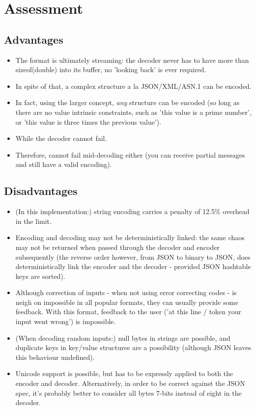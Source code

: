 \section{Assessment}

\subsection{Advantages}

\begin{itemize}
\item The format is ultimately streaming: the decoder never has to have
      more than sizeof(double) into its buffer, no 'looking back' is
      ever required.
\item In spite of that, a complex structure a la JSON/XML/ASN.1 can be
      encoded.
\item In fact, using the larger concept, \textit{any} structure can
      be encoded (so long as there are no value intrinsic constraints, such
      as 'this value is a prime number', or 'this value is three times the
      previous value').
\item While the decoder cannot fail.
\item Therefore, cannot fail mid-decoding either (you can receive
      partial messages and still have a valid encoding).
\end{itemize}

\subsection{Disadvantages}

\begin{itemize}
\item (In this implementation:)
      string encoding carries a penalty of 12.5\% overhead in the limit.
\item Encoding and decoding may not be deterministically linked: the same
      chaos may not be returned when passed through the decoder and encoder
      subsequently (the reverse order however, from JSON to binary to JSON,
      does deterministically link the encoder and the decoder - provided
      JSON hashtable keys are sorted).
\item Although correction of inputs - when not using error correcting codes -
      is neigh on impossible in all popular formats, they can usually
      provide some feedback. With this format, feedback to the user
      ('at this line / token your input went wrong') is impossible.
\item (When decoding random inputs:) null bytes in strings are possible,
      and duplicate
      keys in key/value structures are a possibility (although JSON
      leaves this behaviour undefined).
\item Unicode support is possible, but has to be expressly applied to
      both the encoder and decoder. Alternatively, in order to be
      correct against the JSON spec, it's probably better to consider
      all bytes 7-bits instead of eight in the decoder.
\end{itemize}

